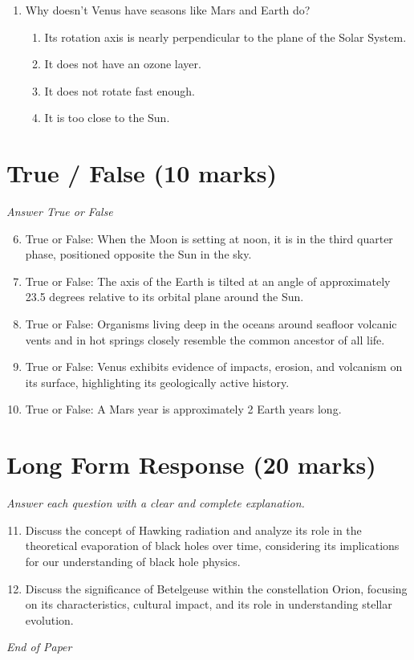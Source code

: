 \documentclass[12pt]{article}
\begin{document}
\begin{enumerate}[label=\arabic*.]
\begin{enumerate}[label=(\alph*)]
    \item From fragments of planets ejected by impacts
    \item From dust grains that escape from passing comets
    \item From accretion within the solar nebula at the same time the planets formed
\end{enumerate}
\item Why doesn't Venus have seasons like Mars and Earth do?
\begin{enumerate}[label=(\alph*)]
    \item Its rotation axis is nearly perpendicular to the plane of the Solar System.
    \item It does not have an ozone layer.
    \item It does not rotate fast enough.
    \item It is too close to the Sun.
\end{enumerate}
\end{enumerate}

\section*{True / False (10 marks)}
\textit{Answer True or False}
\begin{enumerate}[label=\arabic*.]
\setcounter{enumi}{5}
\item True or False: When the Moon is setting at noon, it is in the third quarter phase, positioned opposite the Sun in the sky.
\item True or False: The axis of the Earth is tilted at an angle of approximately 23.5 degrees relative to its orbital plane around the Sun.
\item True or False: Organisms living deep in the oceans around seafloor volcanic vents and in hot springs closely resemble the common ancestor of all life.
\item True or False: Venus exhibits evidence of impacts, erosion, and volcanism on its surface, highlighting its geologically active history.
\item True or False: A Mars year is approximately 2 Earth years long.
\end{enumerate}

\section*{Long Form Response (20 marks)}
\textit{Answer each question with a clear and complete explanation.}
\begin{enumerate}[label=\arabic*.]
\setcounter{enumi}{10}
\item Discuss the concept of Hawking radiation and analyze its role in the theoretical evaporation of black holes over time, considering its implications for our understanding of black hole physics.
\item Discuss the significance of Betelgeuse within the constellation Orion, focusing on its characteristics, cultural impact, and its role in understanding stellar evolution.
\end{enumerate}

\vfill
\noindent\textit{End of Paper}
\end{document}
